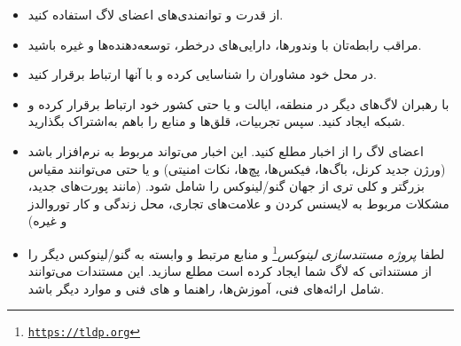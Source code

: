 \begin{itemize}
با اشتیاق و مسئولیت‌پذیری از سیستم‌عامل ما حمایت کنید.
\item
از قدرت و توانمندی‌های اعضای لاگ استفاده کنید.
\item
مراقب رابطه‌تان با وندورها، دارایی‌های درخطر، توسعه‌دهنده‌ها و غیره باشید.
\item
در محل خود مشاوران را شناسایی کرده و با آنها ارتباط برقرار کنید.
\item
با رهبران لاگ‌های دیگر در منطقه، ایالت و یا حتی کشور خود ارتباط برقرار کرده
و شبکه ایجاد کنید. سپس تجربیات، قلق‌ها و منابع را باهم به‌اشتراک بگذارید.
\item
اعضای لاگ را از اخبار مطلع کنید. این اخبار می‌تواند مربوط به نرم‌افزار باشد
(ورژن جدید کرنل، باگ‌ها، فیکس‌ها، پچ‌ها، نکات امنیتی) و یا حتی می‌توانند مقیاس
بزرگتر و کلی تری از جهان گنو/لینوکس را شامل شود. (مانند پورت‌های جدید،
مشکلات مربوط به لایسنس کردن و علامت‌های تجاری، محل زندگی و کار توروالدز و غیره)
\item
لطفا
\emph{پروژه مستندسازی لینوکس}\footnote{\texttt{\url{https://tldp.org}}}
و منابع مرتبط و وابسته به گنو/لینوکس دیگر را از مستنداتی که لاگ شما
ایجاد کرده است مطلع سازید. این مستندات می‌توانند شامل ارائه‌های فنی،
آموزش‌ها، راهنما و ‌های فنی و موارد دیگر باشد.

\end{itemize}

